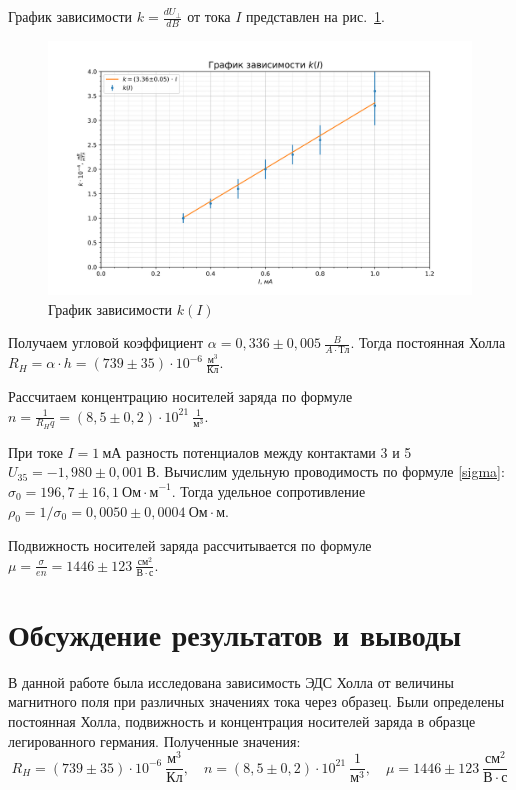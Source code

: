 \documentclass[a4paper, 12pt]{article}
\begin{document}
\newpage

График зависимости $k = \frac{dU_{\perp}}{dB}$ от тока $I$ представлен на рис.~\ref{plot3}.

\begin{figure}[h!]
\begin{center}
    \includegraphics[scale=0.6]{3.3.4_3.png}
\end{center}
\caption{График зависимости $k(I)$}
\label{plot3}
\end{figure}

Получаем угловой коэффициент $\alpha = 0,336\pm0,005~\frac{B}{A \cdot Тл}$. Тогда постоянная Холла \newline $R_H = \alpha \cdot h = (739\pm35) \cdot 10^{-6}~\frac{м^3}{Кл}$.

Рассчитаем концентрацию носителей заряда по формуле $n = \frac{1}{R_H q} = (8,5\pm0,2) \cdot 10^{21}~\frac{1}{м^3}$.

При токе $I = 1~мА$ разность потенциалов между контактами 3 и 5 \newline $U_{35} = -1,980\pm0,001~В$. Вычислим удельную проводимость по формуле \eqref{sigma}: \newline $\sigma_0 = 196,7\pm16,1~{Ом \cdot м}^{-1}$. Тогда удельное сопротивление $\rho_0 = 1/\sigma_0 = 0,0050\pm0,0004~{Ом \cdot м}$.

Подвижность носителей заряда рассчитывается по формуле $\mu = \frac{\sigma}{e n} = 1446\pm123~\frac{см^2}{В \cdot с}$.

\section{Обсуждение результатов и выводы}

В данной работе была исследована зависимость ЭДС Холла от величины магнитного поля при различных значениях тока через образец. Были определены постоянная Холла, подвижность и концентрация носителей заряда в образце легированного германия. Полученные значения:
$$\boxed{R_H = (739\pm35) \cdot 10^{-6}~\frac{м^3}{Кл}, \quad n = (8,5\pm0,2) \cdot 10^{21}~\frac{1}{м^3}, \quad \mu = 1446\pm123~\frac{см^2}{В \cdot с}}$$
\end{document}
